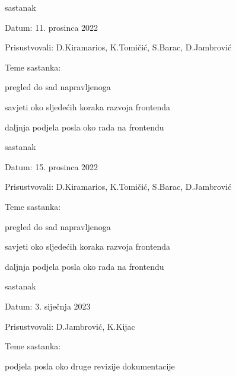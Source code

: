 \begin{packed_enum}
			\item  sastanak
			\item[] \begin{packed_item}
				\item Datum: 11. prosinca 2022
				\item Prisustvovali: D.Kiramarios, K.Tomičić, S.Barac, D.Jambrović
				\item Teme sastanka:
				\begin{packed_item}
					\item pregled do sad napravljenoga
					\item savjeti oko sljedećih koraka razvoja frontenda
					\item daljnja podjela posla oko rada na frontendu
				\end{packed_item}
			\end{packed_item}

			\item  sastanak
			\item[] \begin{packed_item}
				\item Datum: 15. prosinca 2022
				\item Prisustvovali: D.Kiramarios, K.Tomičić, S.Barac, D.Jambrović
				\item Teme sastanka:
				\begin{packed_item}
					\item pregled do sad napravljenoga
					\item savjeti oko sljedećih koraka razvoja frontenda
					\item daljnja podjela posla oko rada na frontendu
				\end{packed_item}
			\end{packed_item}

                \item  sastanak
			\item[] \begin{packed_item}
				\item Datum: 3. siječnja 2023
				\item Prisustvovali: D.Jambrović, K.Kijac
				\item Teme sastanka:
				\begin{packed_item}
					\item podjela posla oko druge revizije dokumentacije
				\end{packed_item}
			\end{packed_item}


\end{packed_enum}
